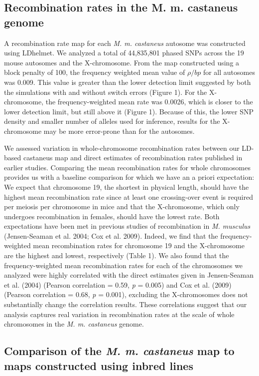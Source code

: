 \subsection{Recombination rates in the M. m. castaneus genome}
 
A recombination rate map for each \emph{M. m. castaneus} autosome was constructed using LDhelmet. We analyzed a total of 44,835,801 phased SNPs across the 19 mouse autosomes and the X-chromosome. From the map constructed using a block penalty of 100, the frequency weighted mean value of $\rho/bp$ for all autosomes was 0.009. This value is greater than the lower detection limit suggested by both the simulations with and without switch errors (Figure 1). For the X-chromosome, the frequency-weighted mean rate was 0.0026, which is closer to the lower detection limit, but still above it (Figure 1). Because of this, the lower SNP density and smaller number of alleles used for inference, results for the X-chromosome may be more error-prone than for the autosomes. 
 
We assessed variation in whole-chromosome recombination rates between our LD-based castaneus map and direct estimates of recombination rates published in earlier studies. Comparing the mean recombination rates for whole chromosomes provides us with a baseline comparison for which we have an a priori expectation: We expect that chromosome 19, the shortest in physical length, should have the highest mean recombination rate since at least one crossing-over event is required per meiosis per chromosome in mice and that the X-chromosome, which only undergoes recombination in females, should have the lowest rate. Both expectations have been met in previous studies of recombination in \emph{M. musculus} (Jensen-Seaman et al. 2004; Cox et al. 2009). Indeed, we find that the frequency-weighted mean recombination rates for chromosome 19 and the X-chromosome are the highest and lowest, respectively (Table 1). We also found that the frequency-weighted mean recombination rates for each of the chromosomes we analyzed were highly correlated with the direct estimates given in Jensen-Seaman et al. (2004) (Pearson correlation = 0.59, \emph{p} = 0.005) and Cox et al. (2009) (Pearson correlation = 0.68, \emph{p} = 0.001), excluding the X-chromosomes does not substantially change the correlation results. These correlations suggest that our analysis captures real variation in recombination rates at the scale of whole chromosomes in the \emph{M. m. castaneus} genome. 

\subsection{Comparison of the \emph{M. m. castaneus} map to maps constructed using inbred lines}
 
